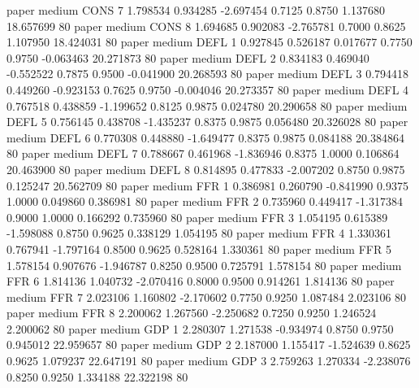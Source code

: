                  paper     medium     CONS                 7  1.798534 0.934285 -2.697454 0.7125 0.8750  1.137680   18.657699 80
                 paper     medium     CONS                 8  1.694685 0.902083 -2.765781 0.7000 0.8625  1.107950   18.424031 80
                 paper     medium     DEFL                 1  0.927845 0.526187  0.017677 0.7750 0.9750 -0.063463   20.271873 80
                 paper     medium     DEFL                 2  0.834183 0.469040 -0.552522 0.7875 0.9500 -0.041900   20.268593 80
                 paper     medium     DEFL                 3  0.794418 0.449260 -0.923153 0.7625 0.9750 -0.004046   20.273357 80
                 paper     medium     DEFL                 4  0.767518 0.438859 -1.199652 0.8125 0.9875  0.024780   20.290658 80
                 paper     medium     DEFL                 5  0.756145 0.438708 -1.435237 0.8375 0.9875  0.056480   20.326028 80
                 paper     medium     DEFL                 6  0.770308 0.448880 -1.649477 0.8375 0.9875  0.084188   20.384864 80
                 paper     medium     DEFL                 7  0.788667 0.461968 -1.836946 0.8375 1.0000  0.106864   20.463900 80
                 paper     medium     DEFL                 8  0.814895 0.477833 -2.007202 0.8750 0.9875  0.125247   20.562709 80
                 paper     medium      FFR                 1  0.386981 0.260790 -0.841990 0.9375 1.0000  0.049860    0.386981 80
                 paper     medium      FFR                 2  0.735960 0.449417 -1.317384 0.9000 1.0000  0.166292    0.735960 80
                 paper     medium      FFR                 3  1.054195 0.615389 -1.598088 0.8750 0.9625  0.338129    1.054195 80
                 paper     medium      FFR                 4  1.330361 0.767941 -1.797164 0.8500 0.9625  0.528164    1.330361 80
                 paper     medium      FFR                 5  1.578154 0.907676 -1.946787 0.8250 0.9500  0.725791    1.578154 80
                 paper     medium      FFR                 6  1.814136 1.040732 -2.070416 0.8000 0.9500  0.914261    1.814136 80
                 paper     medium      FFR                 7  2.023106 1.160802 -2.170602 0.7750 0.9250  1.087484    2.023106 80
                 paper     medium      FFR                 8  2.200062 1.267560 -2.250682 0.7250 0.9250  1.246524    2.200062 80
                 paper     medium      GDP                 1  2.280307 1.271538 -0.934974 0.8750 0.9750  0.945012   22.959657 80
                 paper     medium      GDP                 2  2.187000 1.155417 -1.524639 0.8625 0.9625  1.079237   22.647191 80
                 paper     medium      GDP                 3  2.759263 1.270334 -2.238076 0.8250 0.9250  1.334188   22.322198 80
